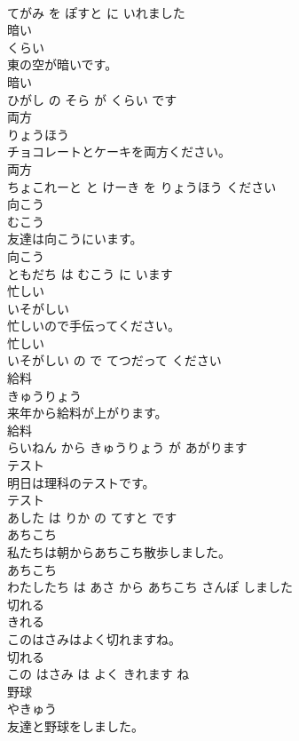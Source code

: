 \documentclass[8pt]{extreport}
\begin{document}
\begin{CJK}{UTF8}{min}
\\	てがみ を ぽすと に いれました			
\\	暗い	
\\	くらい			
\\	東の空が暗いです。	
\\	暗い 
\\	ひがし の そら が くらい です			
\\	両方	
\\	りょうほう			
\\	チョコレートとケーキを両方ください。	
\\	両方 
\\	ちょこれーと と けーき を りょうほう ください			
\\	向こう	
\\	むこう			
\\	友達は向こうにいます。	
\\	向こう 
\\	ともだち は むこう に います			
\\	忙しい	
\\	いそがしい			
\\	忙しいので手伝ってください。	
\\	忙しい 
\\	いそがしい の で てつだって ください			
\\	給料	
\\	きゅうりょう			
\\	来年から給料が上がります。	
\\	給料 
\\	らいねん から きゅうりょう が あがります			
\\	テスト	
\\	明日は理科のテストです。	
\\	テスト 
\\	あした は りか の てすと です			
\\	あちこち	
\\	私たちは朝からあちこち散歩しました。	
\\	あちこち 
\\	わたしたち は あさ から あちこち さんぽ しました			
\\	切れる	
\\	きれる			
\\	このはさみはよく切れますね。	
\\	切れる 
\\	この はさみ は よく きれます ね			
\\	野球	
\\	やきゅう			
\\	友達と野球をしました。	

\end{CJK}
\end{document}
